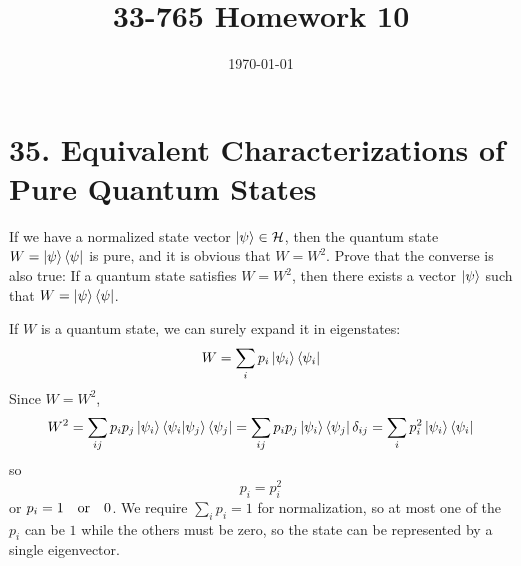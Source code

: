 \documentclass[a4paper,twoside]{article}
\title{33-765 Homework 10}
\date{\today}
\begin{document}
\maketitle

\section*{35. Equivalent Characterizations of Pure Quantum States}
If we have a normalized state vector $\ket{\psi} \in \mathcal{H} $, then the quantum state $ W =\ket{\psi}\bra{\psi} $ is pure, and it is obvious that $ W = W^2 $. Prove that the converse is also true: If a quantum state satisfies $ W = W^2 $, then there exists a vector $\ket{\psi} $ such that $ W =\ket{\psi}\bra{\psi} $.
\begin{problem}
    If $ W $ is a quantum state, we can surely expand it in eigenstates:
    \begin{equation}
        W = \sum_i p_i\ket{\psi_i}\bra{\psi_i}
    \end{equation}
    Since $ W = W^2 $,
    \begin{equation}
        W^2 = \sum_{ij} p_i p_j\ket{\psi_i}\bra{\psi_i}\ket{\psi_j}\bra{\psi_j} = \sum_{ij} p_i p_j\ket{\psi_i}\bra{\psi_j} \delta_{ij} = \sum_{i} p_i^2\ket{\psi_i}\bra{\psi_i}
    \end{equation}
    so
    \begin{equation}
        p_i = p_i^2
    \end{equation}
    or $ p_i = 1 \qor 0 $. We require $ \sum_i p_i = 1 $ for normalization, so at most one of the $ p_i $ can be $ 1 $ while the others must be zero, so the state can be represented by a single eigenvector.
\end{problem}
\end{document}
